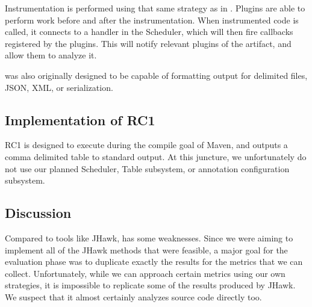 Instrumentation is performed using that same strategy as in \ct{}. Plugins are able to perform work before and after the instrumentation. When instrumented code is called, it connects to a handler in the Scheduler, which will then fire callbacks registered by the plugins. This will notify relevant plugins of the artifact, and allow them to analyze it.

\mt{} was also originally designed to be capable of formatting output for delimited files, JSON, XML, or serialization.

\subsection{Implementation of RC1}

RC1 is designed to execute during the compile goal of Maven, and outputs a comma delimited table to standard output. At this juncture, we unfortunately do not use our planned Scheduler, Table subsystem, or annotation configuration subsystem.



\subsection{Discussion}

Compared to tools like JHawk, \mt{} has some weaknesses. Since we were aiming to implement all of the JHawk methods that were feasible, a major goal for the evaluation phase was to duplicate exactly the results for the metrics that we can collect. Unfortunately, while we can approach certain metrics using our own strategies, it is impossible to replicate some of the results produced by JHawk. We suspect that it almost certainly analyzes source code directly too.

